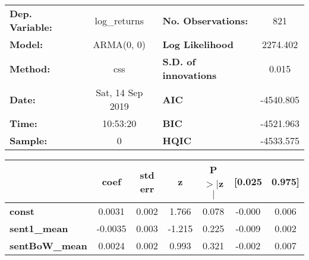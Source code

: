 \begin{center}
\begin{tabular}{lclc}
\toprule
\textbf{Dep. Variable:} &   log\_returns   & \textbf{  No. Observations:  } &    821      \\
\textbf{Model:}         &    ARMA(0, 0)    & \textbf{  Log Likelihood     } &  2274.402   \\
\textbf{Method:}        &       css        & \textbf{  S.D. of innovations} &   0.015     \\
\textbf{Date:}          & Sat, 14 Sep 2019 & \textbf{  AIC                } & -4540.805   \\
\textbf{Time:}          &     10:53:20     & \textbf{  BIC                } & -4521.963   \\
\textbf{Sample:}        &        0         & \textbf{  HQIC               } & -4533.575   \\
\bottomrule
\end{tabular}
\begin{tabular}{lcccccc}
                       & \textbf{coef} & \textbf{std err} & \textbf{z} & \textbf{P$> |$z$|$} & \textbf{[0.025} & \textbf{0.975]}  \\
\midrule
\textbf{const}         &       0.0031  &        0.002     &     1.766  &         0.078        &       -0.000    &        0.006     \\
\textbf{sent1\_mean}   &      -0.0035  &        0.003     &    -1.215  &         0.225        &       -0.009    &        0.002     \\
\textbf{sentBoW\_mean} &       0.0024  &        0.002     &     0.993  &         0.321        &       -0.002    &        0.007     \\
\bottomrule
\end{tabular}
\end{center}
